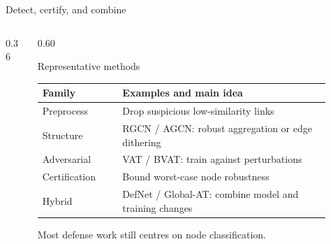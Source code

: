 \begin{frame}{Detect, certify, and combine}
  \begin{columns}[T,onlytextwidth]
    \begin{column}{0.36\textwidth}
      \vspace{0.35em}
    \end{column}
    \begin{column}{0.60\textwidth}
      \begin{block}{Representative methods}
        \scriptsize
        \begin{tabular}{@{}p{0.25\linewidth}p{0.65\linewidth}@{}}
          \toprule
          Family & Examples and main idea \\
          \midrule
          Preprocess & Drop suspicious low-similarity links \\
          Structure & RGCN / AGCN: robust aggregation or edge dithering \\
          Adversarial & VAT / BVAT: train against perturbations \\
          Certification & Bound worst-case node robustness \\
          Hybrid & DefNet / Global-AT: combine model and training changes \\
          \bottomrule
        \end{tabular}
      \end{block}
      \vspace{0.45em}

      {\footnotesize\color{PresThreeMuted}Most defense work still centres on node classification.}
    \end{column}
  \end{columns}
\end{frame}
